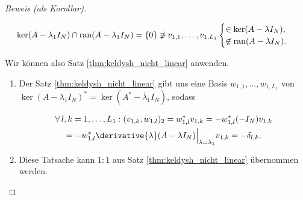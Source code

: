 \begin{proof}[Beweis (als Korollar)]
\begin{enumerate}[label = \arabic*.]
        \begin{align*}
            \ker (A - \lambda_1 I_N) \cap \operatorname{ran} (A - \lambda_1 I_N)
            =
            {\left \{ 0 \right \}}
            \not \ni
            v_{1, 1}, \dots, v_{1, L_1}
            \begin{cases}
                     \in \ker (A - \lambda I_N), \\
                \not \in \operatorname{ran} (A - \lambda I_N).
            \end{cases}
        \end{align*}
    
    \end{enumerate}

    Wir können also Satz \ref{thm:keldysh_nicht_linear} anwenden.
    
    \begin{enumerate}[label = (\roman*), start = 2]

        \item Der Satz \ref{thm:keldysh_nicht_linear} gibt uns eine Basis $w_{1, 1}, \dots, w_{1, L_1}$ von $\ker (A - \lambda_1 I_N)^\ast = \ker (A^\ast - \overline \lambda_1 I_N)$, sodass
        
        \begin{multline*}
            \Forall l, k = 1, \dots, L_1:
                (v_{1, k}, w_{1, l})_2
                =
                w_{1, l}^\ast v_{1, k}
                =
                -w_{1, l}^\ast (-I_N) v_{1, k} \\
                =
                -w_{1, l}^\ast \derivative{\lambda}(A - \lambda I_N) \Big |_{\lambda = \lambda_1} v_{1, k}
                =
                -\delta_{l, k}.
        \end{multline*}

        \item Diese Tatsache kann $1 : 1$ aus Satz \ref{thm:keldysh_nicht_linear} übernommen werden.

    \end{enumerate}
    
\end{proof}
